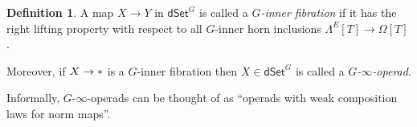 \documentclass[a4paper,10pt]{article}%
\numberwithin{equation}{section}
\numberwithin{figure}{section}
\theoremstyle{definition} %
\newtheorem{definition}[equation]{Definition}%
\newtheorem{example}[equation]{Example}%
\newcommand{\dSet}{\mathsf{dSet}}
\DeclareMathOperator{\Hom}{Hom}%
\newcommand{\1}{\ensuremath{\mathbbm 1}}%
\begin{document}
\begin{definition}
	A map $X \to Y$ in $\dSet^G$
	is called a \emph{$G$-inner fibration}
	if it has the right lifting property
	with respect to all $G$-inner horn inclusions
	$\Lambda^E[T] \to \Omega[T]$.
	
	Moreover, 
	if $X \to \**$
	is a $G$-inner fibration
	then 
	$X \in \dSet^G$ is called a \textit{$G$-$\infty$-operad}.
\end{definition}


Informally,
$G$-$\infty$-operads can be thought of as
``operads with weak composition laws for norm maps''.


\end{document}
